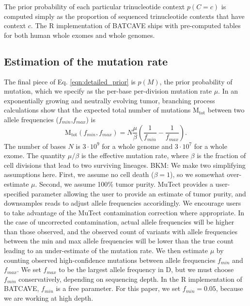 \documentclass[a4,center,fleqn]{NAR}
\newcommand{\bkmcomment}[1]{{\color{blue}BKM: #1}}
\newcommand{\batcave}{BATCAVE\xspace}
\begin{document}
The prior probability of each particular trinucleotide context $p(C = c)$ is computed simply as the proportion of sequenced trinucleotide contexts that have context $c$.
The R implementation of \batcave ships with pre-computed tables for both human whole exomes and whole genomes.

\subsection{Estimation of the mutation rate}
The final piece of Eq. \ref{eqn:detailed_prior} is $p(M)$, the prior probability of mutation, which we specify as the per-base per-division mutation rate $\mu$.
In an exponentially growing and neutrally evolving tumor, branching process calculations \cite{Williams2018} show that the expected total number of mutations $\mathrm{M_{tot}}$ between two allele frequencies ($f_{min}$,$f_{max}$) is
\begin{equation}
  \label{eqn:mut_rate}
  \mathrm{M_{tot}}(f_{min},f_{max}) = N\frac{\mu}{\beta}\left(\frac{1}{f_{min}} - \frac{1}{f_{max}}\right).
\end{equation}
The number of bases $N$ is $3\cdot10^9$ for a whole genome and $3\cdot10^7$ for a whole exome.
The quantity $\mu/\beta$ is the effective mutation rate, where $\beta$ is the fraction of cell divisions that lead to two surviving lineages.
\bkmcomment{We make two simplifying assumptions here.
First, we assume no cell death ($\beta = 1$), so we somewhat over-estimate $\mu$.
Second, we assume 100\% tumor purity.
MuTect provides a user-specified parameter allowing the user to provide an estimate of tumor purity, and downsamples reads to adjust allele frequencies accoridingly.
We encourage users to take advantage of the MuTect contamination correction where appropriate.
In the case of uncorrected contamination, actual allele frequencies will be higher than those observed, and the observed count of variants with allele frequencies between the min and max allele frequencies will be lower than the true count leading to an under-estimate of the mutation rate.
}
We then estimate $\mu$ by counting observed high-confidence mutations between allele frequencies $f_{min}$ and $f_{max}$.
We set $f_{max}$ to be the largest allele frequency in $\mathrm{D}$, but we must choose $f_{min}$ conservatively, depending on sequencing depth.
In the R implementation of \batcave, $f_{min}$ is a free parameter.
For this paper, we set $f_{min} = 0.05$, because we are working at high depth.
\end{document}
